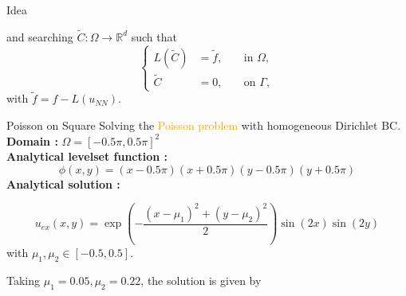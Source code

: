\begin{frame}{Idea}
	\vspace{-8pt}
	\begin{minipage}{\linewidth}
		and searching $\tilde{C}: \Omega \rightarrow \mathbb{R}^d$ such that
		\begin{equation}
			\left\{\begin{aligned}
				L(\tilde{C})&=\tilde{f}, \; &&\text{in } \Omega, \\
				\tilde{C}&=0, \; &&\text{on } \Gamma,
			\end{aligned}\right. \label{corr_add}
		\end{equation}
		with $\tilde{f}=f-L(u_{NN})$.  
	\end{minipage}
\end{frame}

\begin{frame}{Poisson on Square}
	Solving the \textcolor{orange}{Poisson problem} with homogeneous Dirichlet BC. \\
	 \textbf{Domain :} $\Omega=[−0.5\pi,0.5\pi]^2$ \\
	 \textbf{Analytical levelset function :}
	\small
	\begin{equation*}
		\phi(x,y)=(x-0.5\pi)(x+0.5\pi)(y-0.5\pi)(y+0.5\pi)
	\end{equation*} 
	 \textbf{Analytical solution :}
	\small
	
	\vspace{-8pt}
	\begin{equation*}
		u_{ex}(x,y)=\exp\left(−\frac{(x-\mu_1)^2+(y-\mu_2)^2}{2}\right)\sin(2x)\sin(2y)
	\end{equation*} 
	\normalsize
	with $\mu_1,\mu_2\in[-0.5,0.5]$. 
	
	\vspace{8pt}
	Taking $\mu_1=0.05,\mu_2=0.22$, the solution is given by
	\begin{minipage}{0.68\linewidth}
		\centering
	\end{minipage}
	\begin{minipage}{0.28\linewidth}
		\flushright
	\end{minipage}
\end{frame}

